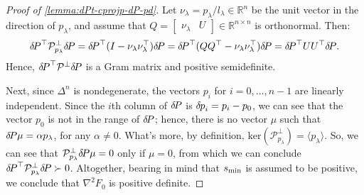 \documentclass{article}
\begin{document}
\begin{proof}[Proof of \cref{lemma:dPt-cprojp-dP-pd}]

  Let $\nu_\lambda = p_\lambda/l_\lambda \in \mathbb{R}^n$ be the unit
  vector in the direction of $p_\lambda$, and assume that
  $Q = \begin{bmatrix} \nu_\lambda & U \end{bmatrix} \in \mathbb{R}^{n
    \times n}$ is orthonormal. Then:
  \begin{equation}
    {\delta \hspace{-0.14em} P}^\top \mathcal{P}^\perp_{p_\lambda} {\delta \hspace{-0.14em} P} = {\delta \hspace{-0.14em} P}^\top {(I - \nu_\lambda \nu_\lambda^\top)} {\delta \hspace{-0.14em} P} = {\delta \hspace{-0.14em} P}^\top {(QQ^\top - \nu_\lambda \nu_\lambda^\top)} {\delta \hspace{-0.14em} P} = {\delta \hspace{-0.14em} P}^\top U U^\top {\delta \hspace{-0.14em} P}.
  \end{equation}
  Hence, ${\delta \hspace{-0.14em} P}^\top \mathcal{P}^\perp {\delta \hspace{-0.14em} P}$ is a Gram matrix
  and positive semidefinite.

  Next, since $\Delta^n$ is nondegenerate, the vectors $p_i$ for
  $i = 0, \hdots, n - 1$ are linearly independent. Since the $i$th
  column of ${\delta \hspace{-0.14em} P}$ is ${\delta \hspace{-0.08em} p}_i = p_i - p_0$, we can see that
  the vector $p_0$ is not in the range of ${\delta \hspace{-0.14em} P}$; hence, there is
  no vector $\mu$ such that ${\delta \hspace{-0.14em} P} \mu = \alpha p_\lambda$, for any
  $\alpha \neq 0$. What's more, by definition,
  $\text{ker}(\mathcal{P}_{p_\lambda}^\perp) = \langle p_\lambda
  \rangle$. So, we can see that
  $\mathcal{P}^\perp_{p_\lambda} {\delta \hspace{-0.14em} P} \mu = 0$ only if $\mu = 0$,
  from which we can conclude
  ${\delta \hspace{-0.14em} P}^\top \mathcal{P}^\perp_{p_\lambda} {\delta \hspace{-0.14em} P} \succ
  0$. Altogether, bearing in mind that $s_{\operatorname{min}}$ is assumed to be
  positive, we conclude that $\nabla^2 F_0$ is positive definite.
\end{proof}
\end{document}
